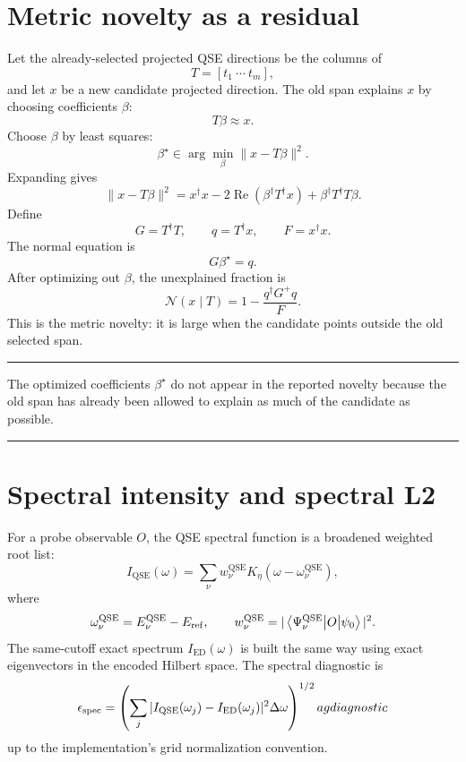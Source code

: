 \documentclass[10pt,twocolumn]{article}
\newcommand{\matel}[3]{\left\langle#1\middle|#2\middle|#3\right\rangle}
\newcommand{\QSE}{\mathrm{QSE}}
\newcommand{\ED}{\mathrm{ED}}
\newenvironment{paperbox}{\par\smallskip\noindent\begin{center}\begin{minipage}{0.94\linewidth}\small\hrule\smallskip}{\smallskip\hrule\end{minipage}\end{center}\smallskip}
\begin{document}
\section{Metric novelty as a residual}
Let the already-selected projected QSE directions be the columns of
\begin{equation}
  T=[t_1\ \cdots\ t_m],
\end{equation}
and let \(x\) be a new candidate projected direction.  The old span explains \(x\) by choosing coefficients \(\beta\):
\begin{equation}
  T\beta \approx x.
\end{equation}
Choose \(\beta\) by least squares:
\begin{equation}
  \beta^\star \in \arg\min_\beta \|x-T\beta\|^2.
\end{equation}
Expanding gives
\begin{equation}
  \|x-T\beta\|^2
  = x^\dagger x -2\operatorname{Re}(\beta^\dagger T^\dagger x)
  +\beta^\dagger T^\dagger T\beta.
\end{equation}
Define
\begin{equation}
  G=T^\dagger T,
  \qquad q=T^\dagger x,
  \qquad F=x^\dagger x.
\end{equation}
The normal equation is
\begin{equation}
  G\beta^\star=q.
\end{equation}
After optimizing out \(\beta\), the unexplained fraction is
\begin{equation}
  \mathcal N(x\mid T)
  =1-\frac{q^\dagger G^+q}{F}.
\end{equation}
This is the metric novelty: it is large when the candidate points outside the old selected span.

\begin{paperbox}
The optimized coefficients \(\beta^\star\) do not appear in the reported novelty because the old span has already been allowed to explain as much of the candidate as possible.
\end{paperbox}

\section{Spectral intensity and spectral L2}
For a probe observable \(O\), the QSE spectral function is a broadened weighted root list:
\begin{equation}
  I_{\QSE}(\omega)
  =\sum_\nu w_\nu^{\QSE}K_\eta(\omega-\omega_\nu^{\QSE}),
\end{equation}
where
\begin{equation}
  \omega_\nu^{\QSE}=E_\nu^{\QSE}-E_{\rm ref},
  \qquad
  w_\nu^{\QSE}=|\matel{\Psi_\nu^{\QSE}}{O}{\psi_0}|^2.
\end{equation}
The same-cutoff exact spectrum \(I_{\ED}(\omega)\) is built the same way using exact eigenvectors in the encoded Hilbert space.  The spectral diagnostic is
\begin{equation}
  \epsilon_{\rm spec}
  =\left(\sum_j |I_{\QSE}(\omega_j)-I_{\ED}(\omega_j)|^2\Delta\omega\right)^{1/2}
	ag{diagnostic}
\end{equation}
up to the implementation's grid normalization convention.
\end{document}
